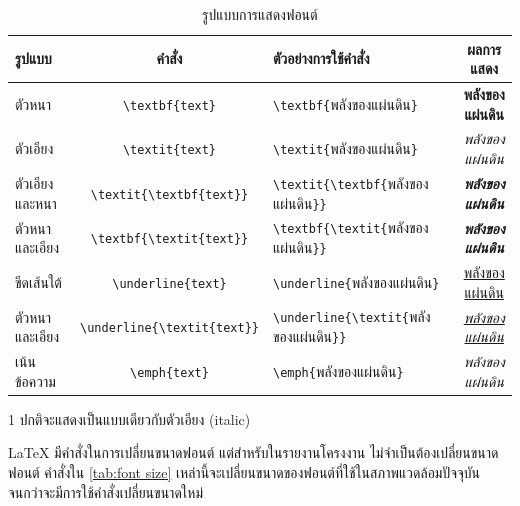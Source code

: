 \begin{table}[H]
    \centering
    \footnotesize
    \begin{threeparttable}
        \caption{รูปแบบการแสดงฟอนต์}
        \label{tab:font style}
        \begin{tabular}{l c C{6cm} c}
            \toprule
            \textbf{รูปแบบ} & \textbf{คำสั่ง} & \textbf{ตัวอย่างการใช้คำสั่ง} & \textbf{ผลการแสดง} \\
            \midrule
            ตัวหนา & \verb|\textbf{text}| & \verb|\textbf{|พลังของแผ่นดิน\verb|}| & \textbf{พลังของแผ่นดิน} \\
            ตัวเอียง & \verb|\textit{text}| & \verb|\textit{|พลังของแผ่นดิน\verb|}| & \textit{พลังของแผ่นดิน} \\
            ตัวเอียงและหนา & \verb|\textit{\textbf{text}}| & \verb|\textit{\textbf{|พลังของแผ่นดิน\verb|}}| & \textit{\textbf{พลังของแผ่นดิน}} \\
            ตัวหนาและเอียง & \verb|\textbf{\textit{text}}| & \verb|\textbf{\textit{|พลังของแผ่นดิน\verb|}}| & \textbf{\textit{พลังของแผ่นดิน}} \\
            ขีดเส้นใต้ & \verb|\underline{text}| & \verb|\underline{|พลังของแผ่นดิน\verb|}| & \underline{พลังของแผ่นดิน} \\
            ตัวหนาและเอียง & \verb|\underline{\textit{text}}| & \verb|\underline{\textit{|พลังของแผ่นดิน\verb|}}| & \underline{\textit{พลังของแผ่นดิน}} \\
            เน้นข้อความ & \verb|\emph{text}| & \verb|\emph{|พลังของแผ่นดิน\verb|}| & \emph{พลังของแผ่นดิน} \\
            \bottomrule
        \end{tabular}
        \begin{tablenotes}
            \item [1] ปกติจะแสดงเป็นแบบเดียวกับตัวเอียง (italic)
        \end{tablenotes}
    \end{threeparttable}
\end{table}

LaTeX มีคำสั่งในการเปลี่ยนขนาดฟอนต์ แต่สำหรับในรายงานโครงงาน ไม่จำเป็นต้องเปลี่ยนขนาดฟอนต์ คำสั่งใน \autoref{tab:font size} เหล่านี้จะเปลี่ยนขนาดของฟอนต์ที่ใช้ในสภาพแวดล้อม\mbox{ปัจจุบัน} จนกว่าจะมีการใช้คำสั่งเปลี่ยนขนาดใหม่

